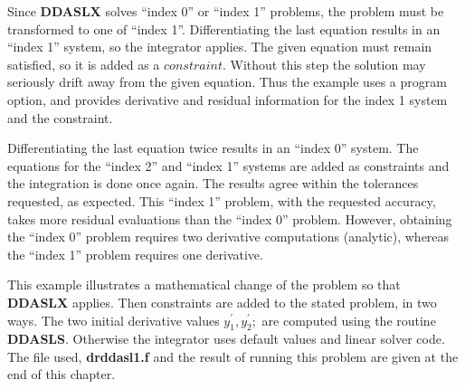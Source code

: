 \documentclass[twoside]{MATH77}
\begin{document}
Since \textbf{DDASLX} solves ``index 0'' or ``index 1'' problems, the problem must
be transformed to one of ``index 1''.  Differentiating the last equation results in an
``index 1'' system, so the
integrator applies.  The given equation must remain satisfied, so it is added as
a $constraint$.  Without this step the solution may seriously drift
away from the given equation.  Thus the example
uses a  program option, and provides derivative and residual information for the index 1
system and the constraint.

Differentiating the last equation twice results in an ``index 0'' system.
The equations for the ``index 2'' and ``index 1''
systems are added as constraints and the integration is done once again.
The results agree within the tolerances requested, as expected.
This ``index 1'' problem, with the requested accuracy, takes more
residual evaluations than the ``index 0'' problem.
However, obtaining the ``index 0'' problem requires two derivative computations
(analytic), whereas the ``index 1'' problem requires one derivative.

This example illustrates a mathematical change of the problem so that
\textbf{DDASLX} applies.  Then constraints are added to the stated
problem, in two ways.  The two initial derivative values $y^{\prime}_1,
y^{\prime}_2;$ are computed using the routine \textbf{DDASLS}.  Otherwise
the integrator uses default values and linear solver code.  The file
used, \textbf{drddasl1.f} and the result of running this problem are
given at the end of this chapter.
\end{document}
